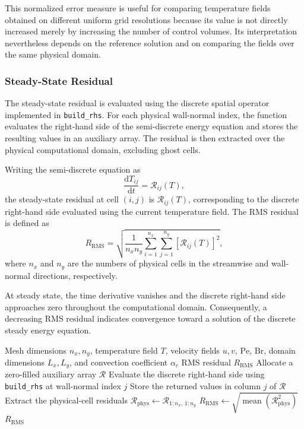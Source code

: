 This normalized error measure is useful for comparing temperature
fields obtained on different uniform grid resolutions because
its value is not directly increased merely by increasing the
number of control volumes. Its interpretation nevertheless depends
on the reference solution and on comparing the fields over the
same physical domain.

\subsubsection{Steady-State Residual}

The steady-state residual is evaluated using the discrete spatial
operator implemented in \texttt{build\_rhs}. For each physical
wall-normal index, the function evaluates the right-hand side
of the semi-discrete energy equation and stores the resulting
values in an auxiliary array. The residual is then extracted
over the physical computational domain, excluding ghost cells.

Writing the semi-discrete equation as
\begin{equation}
\frac{\mathrm{d}T_{ij}}{\mathrm{d}t}
=
\mathcal{R}_{ij}(T),
\end{equation}
the steady-state residual at cell $(i,j)$ is
$\mathcal{R}_{ij}(T)$, corresponding to the discrete right-hand
side evaluated using the current temperature field. The RMS
residual is defined as
\begin{equation}
R_{\mathrm{RMS}}
=
\sqrt{
\frac{1}{n_x n_y}
\sum_{i=1}^{n_x}
\sum_{j=1}^{n_y}
\left[\mathcal{R}_{ij}(T)\right]^2
},
\label{eq:steady_residual_rms}
\end{equation}
where $n_x$ and $n_y$ are the numbers of physical cells in the
streamwise and wall-normal directions, respectively.

At steady state, the time derivative vanishes and the discrete
right-hand side approaches zero throughout the computational
domain. Consequently, a decreasing RMS residual indicates
convergence toward a solution of the discrete steady energy
equation.

\begin{algorithm}[H]
\caption{Steady-State Residual Evaluation}
\label{alg:steady_state_residual}
\begin{algorithmic}[1]
\Require Mesh dimensions $n_x,n_y$, temperature field $T$,
velocity fields $u,v$, $\mathrm{Pe}$, $\mathrm{Br}$,
domain dimensions $L_x,L_y$, and convection coefficient
$\alpha_c$
\Ensure RMS residual $R_{\mathrm{RMS}}$
\State Allocate a zero-filled auxiliary array $\mathcal{R}$
    \State Evaluate the discrete right-hand side using
    \texttt{build\_rhs} at wall-normal index $j$
    \State Store the returned values in column $j$ of
    $\mathcal{R}$
\EndFor
\State Extract the physical-cell residuals
$\mathcal{R}_{\mathrm{phys}}
\gets \mathcal{R}_{1:n_x,\,1:n_y}$
\State $R_{\mathrm{RMS}} \gets
\sqrt{\operatorname{mean}
\left(\mathcal{R}_{\mathrm{phys}}^2\right)}$
\State \Return $R_{\mathrm{RMS}}$
\end{algorithmic}
\end{algorithm}


